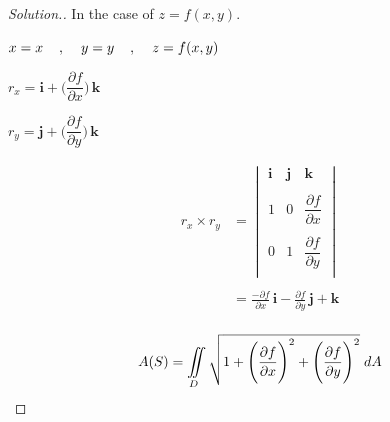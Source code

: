 \documentclass[11pt,a4paper]{article}
\theoremstyle{definition}
\newenvironment{solution}
  {\renewcommand{\qedsymbol}{}\begin{proof}[\textit{Solution}.]}
  {\end{proof}}
\begin{document}
\begin{solution}
In the case of $z = f(x,y)$.


$x = x\hspace{0.4cm}, \hspace{0.4cm} y = y\hspace{0.4cm}, \hspace{0.4cm} z = f(x,y)$


$\displaystyle{r_x = \textbf{i} + \Bigg( \dfrac{\partial f}{\partial x}\Bigg)\,\textbf{k}}$


$\displaystyle{r_y = \textbf{j} + \Bigg( \dfrac{\partial f}{\partial y}\Bigg)\,\textbf{k}}$


\begin{align*}
r_x \times r_y & = \begin{vmatrix}
\textbf{i} & \textbf{j} & \textbf{k}\\\\
1 & 0 & \dfrac{\partial f}{\partial x}\\\\
0 & 1 & \dfrac{\partial f}{\partial y}\\
\end{vmatrix}\\\\
& = \frac{-\partial f}{\partial x}\,\textbf{i} - \frac{\partial f}{\partial y}\,\textbf{j} + \textbf{k}\\
\end{align*}

$$ A(S) = \iint\limits_D\sqrt{1 + \Bigg(\dfrac{\partial f}{\partial x}\Bigg)^2 + \Bigg(\dfrac{\partial f}{\partial y}\Bigg)^2 }\hspace{0.1cm}dA$$
\end{solution}
\end{document}
